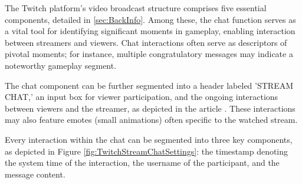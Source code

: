 
    

    The Twitch platform's video broadcast structure comprises five essential components, detailed in \ref{sec:BackInfo}. Among these, the chat function serves as a vital tool for identifying significant moments in gameplay, enabling interaction between streamers and viewers. Chat interactions often serve as descriptors of pivotal moments; for instance, multiple congratulatory messages may indicate a noteworthy gameplay segment.
    
    The chat component can be further segmented into a header labeled 'STREAM CHAT,' an input box for viewer participation, and the ongoing interactions between viewers and the streamer, as depicted in the article \cite{TwitchChatBasics}. These interactions may also feature emotes (small animations) often specific to the watched stream.
    


    Every interaction within the chat can be segmented into three key components, as depicted in Figure \ref{fig:TwitchStreamChatSettings}: the timestamp denoting the system time of the interaction, the username of the participant, and the message content.

